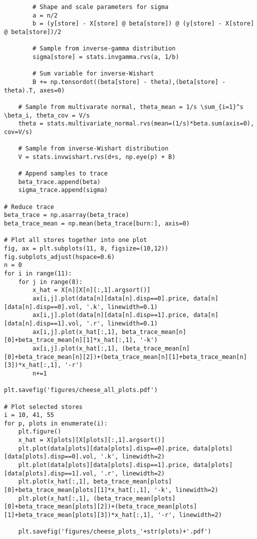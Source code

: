 \documentclass[11pt]{article}
\begin{document}
\begin{lstlisting}
        # Shape and scale parameters for sigma
        a = n/2
        b = (y[store] - X[store] @ beta[store]) @ (y[store] - X[store] @ beta[store])/2

        # Sample from inverse-gamma distribution
        sigma[store] = stats.invgamma.rvs(a, 1/b)
    
        # Sum variable for inverse-Wishart
        B += np.tensordot((beta[store] - theta),(beta[store] - theta).T, axes=0)

    # Sample from multivarate normal, theta_mean = 1/s \sum_{i=1}^s \beta_i, theta_cov = V/s
    theta = stats.multivariate_normal.rvs(mean=(1/s)*beta.sum(axis=0), cov=V/s)

    # Sample from inverse-Wishart distribution
    V = stats.invwishart.rvs(d+s, np.eye(p) + B)

    # Append samples to trace
    beta_trace.append(beta)
    sigma_trace.append(sigma)

# Reduce trace
beta_trace = np.asarray(beta_trace)
beta_trace_mean = np.mean(beta_trace[burn:], axis=0)

# Plot all stores together into one plot
fig, ax = plt.subplots(11, 8, figsize=(10,12))
fig.subplots_adjust(hspace=0.6)
n = 0
for i in range(11):
    for j in range(8):
        x_hat = X[n][X[n][:,1].argsort()]
        ax[i,j].plot(data[n][data[n].disp==0].price, data[n][data[n].disp==0].vol, '.k', linewidth=0.1)
        ax[i,j].plot(data[n][data[n].disp==1].price, data[n][data[n].disp==1].vol, '.r', linewidth=0.1)
        ax[i,j].plot(x_hat[:,1], beta_trace_mean[n][0]+beta_trace_mean[n][1]*x_hat[:,1], '-k')
        ax[i,j].plot(x_hat[:,1], (beta_trace_mean[n][0]+beta_trace_mean[n][2])+(beta_trace_mean[n][1]+beta_trace_mean[n][3])*x_hat[:,1], '-r')
        n+=1

plt.savefig('figures/cheese_all_plots.pdf')

# Plot selected stores
i = 10, 41, 55
for p, plots in enumerate(i):
    plt.figure()
    x_hat = X[plots][X[plots][:,1].argsort()]
    plt.plot(data[plots][data[plots].disp==0].price, data[plots][data[plots].disp==0].vol, '.k', linewidth=2)
    plt.plot(data[plots][data[plots].disp==1].price, data[plots][data[plots].disp==1].vol, '.r', linewidth=2)
    plt.plot(x_hat[:,1], beta_trace_mean[plots][0]+beta_trace_mean[plots][1]*x_hat[:,1], '-k', linewidth=2)
    plt.plot(x_hat[:,1], (beta_trace_mean[plots][0]+beta_trace_mean[plots][2])+(beta_trace_mean[plots][1]+beta_trace_mean[plots][3])*x_hat[:,1], '-r', linewidth=2)

    plt.savefig('figures/cheese_plots_'+str(plots)+'.pdf')
    \end{lstlisting}
\end{document}
